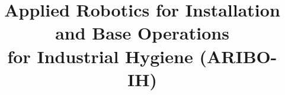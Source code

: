 \title{\LARGE \bf
Applied Robotics for Installation and Base Operations \\for Industrial Hygiene (ARIBO-IH)}
